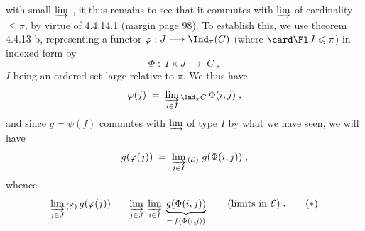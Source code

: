 with small $\varinjlim$ , it thus remains to see that it commutes with $\varinjlim$ of cardinality $\leqslant\pi$, by virtue of 4.4.14.1 (margin page 98). To establish this, we use theorem 4.4.13 b, representing a functor $\varphi:J\longrightarrow\Ind_\pi(C)$ (where $\card\Fl J\leqslant\pi$) in indexed form by
\[
\Phi\;:\;I\times J\;\longrightarrow\;C\;, \tag*{(4.4.16.6)}
\]
$I$ being an ordered set large relative to $\pi$. We thus have
\[
\varphi(j)\;=\;\varinjlim_{i\in I}{}_{\Ind_\pi C}\,\Phi(i,j)\;,
\]
and since $g=\psi(f)$ commutes with $\varinjlim$ of type $I$ by what we have seen, we will have
\[
g(\varphi(j))\;=\;\varinjlim_{i\in I}{}_{(\mathcal{E})}\;g(\Phi(i,j))\;,
\]
whence
\[
\varinjlim_{j\in J}{}_{(\mathcal{E})}\,g(\varphi(j))\;=\;\varinjlim_{j\in J}\;\varinjlim_{i\in I}\;\underbrace{g(\Phi(i,j))}_{=\,f(\Phi(i,j))}\qquad\text{(limits in $\mathcal{E}$)}\;. \tag*{$(*)$}
\]

